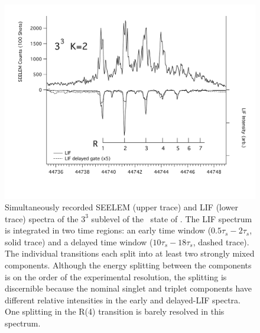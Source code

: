 

\begin{figure}
  \caption{Simultaneously recorded SEELEM (upper trace) and LIF (lower
    trace) spectra of the $3^3$  sublevel of the \astate\ state
    of .  The LIF spectrum is integrated in two time regions:
    an early time window ($0.5\tau_s-2\tau_s$, solid trace) and a
    delayed time window ($10\tau_s-18\tau_s$, dashed trace).  The
    individual transitions each split into at least two strongly mixed
    components.  Although the energy splitting between the components
    is on the order of the experimental resolution, the splitting is
    discernible because the nominal singlet and triplet components
    have different relative intensities in the early and delayed-LIF
    spectra.  One splitting in the R(4) transition is barely resolved
    in this spectrum.}
  \label{fig:spectrum-33k2}
  \centering
  \includegraphics[width=7in,angle=90]{spectrum-33k2-r1r7.pdf}
\end{figure}


